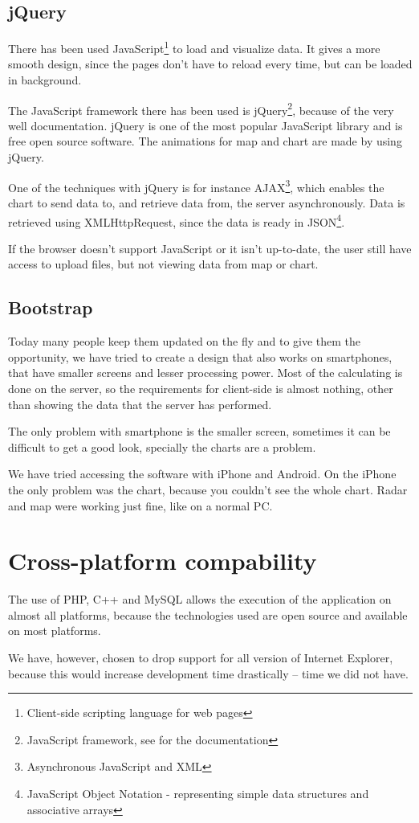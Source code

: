 \subsection{jQuery}
There has been used JavaScript\footnote{Client-side scripting language for web pages} to load and visualize data. It gives a more smooth design, since the pages don't have to reload every time, but can be loaded in background.

The JavaScript framework there has been used is jQuery\footnote{JavaScript framework, see \cite{jquery} for the documentation}, because of the very well documentation. jQuery is one of the most popular JavaScript library and is free open source software. The animations for map and chart are made by using jQuery.
 
One of the techniques with jQuery is for instance AJAX\footnote{Asynchronous JavaScript and XML}, which enables the chart to send data to, and retrieve data from, the server asynchronously. Data is retrieved using XMLHttpRequest, since the data is ready in JSON\footnote{JavaScript Object Notation - representing simple data structures and associative arrays}.

If the browser doesn't support JavaScript or it isn't up-to-date, the user still have access to upload files, but not viewing data from map or chart.

\subsection{Bootstrap}
Today many people keep them updated on the fly and to give them the opportunity, we have tried to create a design that also works on smartphones, that have smaller screens and lesser processing power. Most of the calculating is done on the server, so the requirements for client-side is almost nothing, other than showing the data that the server has performed.

The only problem with smartphone is the smaller screen, sometimes it can be difficult to get a good look, specially the charts are a problem.

We have tried accessing the software with iPhone and Android. On the iPhone the only problem was the chart, because you couldn't see the whole chart. Radar and map were working just fine, like on a normal PC.

\section{Cross-platform compability}
\label{sec:cross-platform}
The use of PHP, C++ and MySQL allows the execution of the application on almost all platforms, because the technologies used are open source and available on most platforms.

We have, however, chosen to drop support for all version of Internet Explorer, because this would increase development time drastically -- time we did not have.






